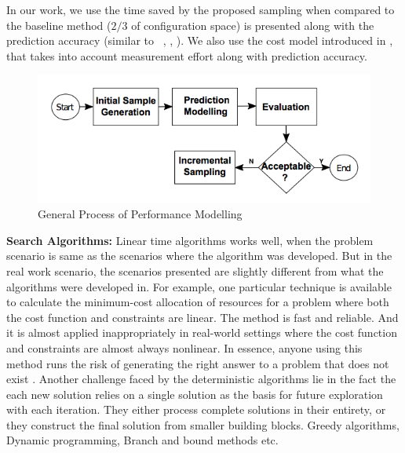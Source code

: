 \documentclass{sig-alternative}
\begin{document}
In our work, we use the time saved by the proposed sampling when compared to the baseline method ($2/3$ of configuration space) is presented along with the prediction accuracy (similar to ~\cite{guo2013variability}, \cite{siegmund2012predicting}, \cite{westermann2012automated}). We also use the cost model introduced in \cite{sarkar2015cost}, that takes into account measurement effort along with prediction accuracy. 
    \begin{figure}[!t]
\includegraphics[width=0.9\linewidth]{Figures/GeneralProcess.png}
\caption{ General Process of Performance Modelling }\label{fig:GeneralProcess}
\end{figure}


    \textbf{Search Algorithms: }Linear time algorithms works well, when the problem scenario is same as the scenarios where the algorithm was developed. But in the real work scenario, the scenarios presented are slightly different from what the algorithms were developed in. For example, one particular technique is available to calculate the minimum-cost allocation of resources for a problem where both the cost function and constraints are linear. The method is fast and reliable. And it is almost applied inappropriately  in real-world settings where the cost function and constraints are almost always nonlinear. In essence, anyone using this method runs the risk of generating the right answer to a problem that does not exist \cite{michalewicz2013solve}. 
    Another challenge faced by the deterministic algorithms lie in the fact the each new solution
relies on a single solution as the basis for future exploration with each iteration. They either process complete solutions in their entirety, or they construct the final solution from smaller building blocks. Greedy algorithms,
Dynamic programming, Branch and bound methods etc. 
\end{document}
